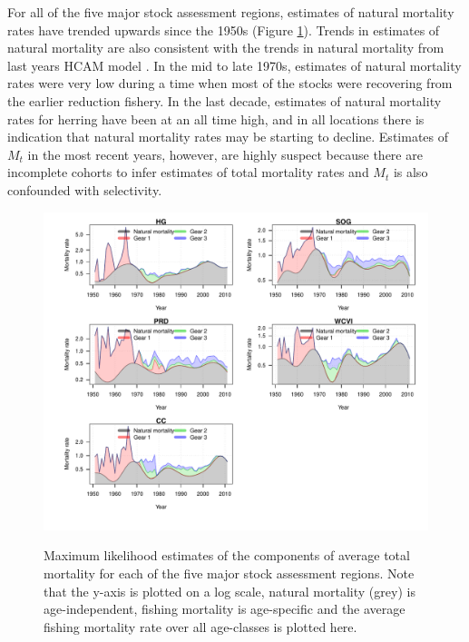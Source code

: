 For all of the five major stock assessment regions, estimates of natural mortality rates have trended upwards since the 1950s (Figure \ref{PartII:Results:figMortality}).  Trends in estimates of natural mortality are also consistent with the trends in natural mortality from last years HCAM model  \citep[see Figure 18 in][]{Clear2010}.  In the mid to late 1970s, estimates of natural mortality rates were very low during a time when most of the stocks were recovering from the earlier reduction fishery.  In the last decade, estimates of natural mortality rates for herring have been at an all time high, and in all locations there is indication that natural mortality rates may be starting to decline. Estimates of $M_t$ in the most recent years, however,  are highly suspect because there are incomplete cohorts to infer estimates of total mortality rates and $M_t$ is also confounded with selectivity.



\begin{figure}[!tbp]
	\includegraphics[width=\textwidth]{../FIGS/qPriorFigs/iscam_fig_mortality.pdf}\\
	\caption{Maximum likelihood estimates of the components of average total mortality for each of the five major stock assessment regions. Note that the y-axis is plotted on a log scale, natural mortality (grey) is age-independent, fishing mortality is age-specific and the average fishing mortality rate over all age-classes is plotted here.}\label{PartII:Results:figMortality}
\end{figure}


